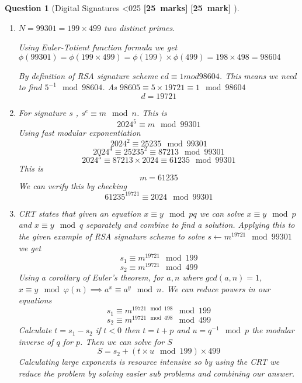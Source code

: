 \documentclass[a4paper]{article}
\theoremstyle{que}
\newtheorem{question}{Question}
\newcommand{\fixoffset}{\mbox{}\vspace*{-\bigskipamount}\vspace*{-\medskipamount}}
\newcommand\points[1]{%
\ifnum1<0#1\relax%
    {\bf \small [#1~marks]}%
  \else%
    {\bf \small [#1~mark]}%
  \fi%
}%
\begin{document}
\newpage


\begin{question}[Digital Signatures \points{25}]
  \fixoffset
  \begin{enumerate}[label=(\alph*)]
    \item \(N = 99301 = 199 \times 499\) two distinct primes.

    Using Euler-Totient function formula we get \(\phi(99301) = \phi(199 \times 499) = \phi(199) \times \phi(499) = 198 \times 498 = 98604\)

    By definition of RSA signature scheme \(ed \equiv 1 mod 98604\). This means we need to find \(5^{-1} \mod 98604\). As \(98605 \equiv 5 \times 19721 \equiv 1 \mod 98604\)
    \[d = 19721\]
    
    \item For signature \(s\) , \(s^e \equiv m \mod n\). 
    This is \[2024^5 \equiv m \mod 99301\]
    Using fast modular exponentiation
    \[2024^2 \equiv 25235 \mod 99301\]
    \[2024^4 \equiv 25235^2 \equiv 87213 \mod 99301\]
    \[2024^ 5\equiv 87213 \times 2024 \equiv 61235 \mod 99301\]
    This is \[m = 61235\]
    We can verify this by checking \[61235^{19721} \equiv 2024 \mod 99301\]
    
    \item CRT states that given an equation \(x \equiv y \mod pq \) we can solve \(x \equiv y \mod p\) and \(x \equiv y \mod q\) separately and combine to find a solution. Applying this to the given example of RSA signature scheme to solve \(s \leftarrow m^{19721} \mod 99301\) we get 
    \[s_1 \equiv m^{19721} \mod 199\]
    \[s_2 \equiv m^{19721} \mod 499\]
    Using a corollary of Euler's theorem, for \(a,n\) where \(gcd(a,n) = 1\), \(x \equiv y \mod \varphi(n) \implies a^x \equiv a^y \mod n \). We can reduce powers in our equations
    \[s_1 \equiv m^{19721 \mod 198} \mod 199\]
    \[s_2 \equiv m^{19721 \mod 498} \mod 499\]
    Calculate \(t = s_1 - s_2\) if \(t<0\) then \(t = t + p\) and \(u = q^{-1} \mod p\) the modular inverse of \(q\) for \(p\). Then we can solve for \(S\)
    \[S = s_2 + (t \times u \mod 199 )\times 499\]
    Calculating large exponents is resource intensive so by using the CRT we reduce the problem by solving easier sub problems and combining our answer.
    

\end{enumerate}
\end{question}
\end{document}
